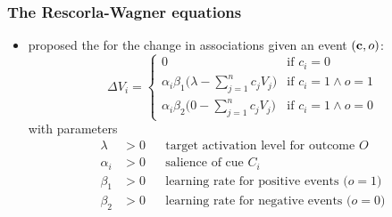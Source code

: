 \documentclass[t]{beamer} %
\begin{document}
\begin{frame}
  \frametitle{The Rescorla-Wagner equations}
  
  \begin{itemize}
  \item \citet{Rescorla:Wagner:72} proposed the  for the change in associations given an event $(\vc, o)$:
    \[
    \Delta V_i =
    \begin{cases}
      0 & \text{if } c_i = 0\\
      \alpha_i \beta_1 \bigl(\lambda - \sum_{j=1}^n c_j V_j \bigr) & \text{if } c_i = 1 \wedge o = 1 \\
      \alpha_i \beta_2 \bigl(0 - \sum_{j=1}^n c_j V_j \bigr) & \text{if } c_i = 1 \wedge o = 0 
    \end{cases}
    \]
    with parameters
    \ungap[.5]
    \begin{align*}
      \lambda &> 0   && \text{target activation level for outcome $O$} \\
      \alpha_i &> 0  && \text{salience of cue $C_i$} \\
      \beta_1 &> 0   && \text{learning rate for positive events ($o = 1$)} \\
      \beta_2 &> 0   && \text{learning rate for negative events ($o = 0$)}
    \end{align*}
  \end{itemize}
\end{frame}
\end{document}
